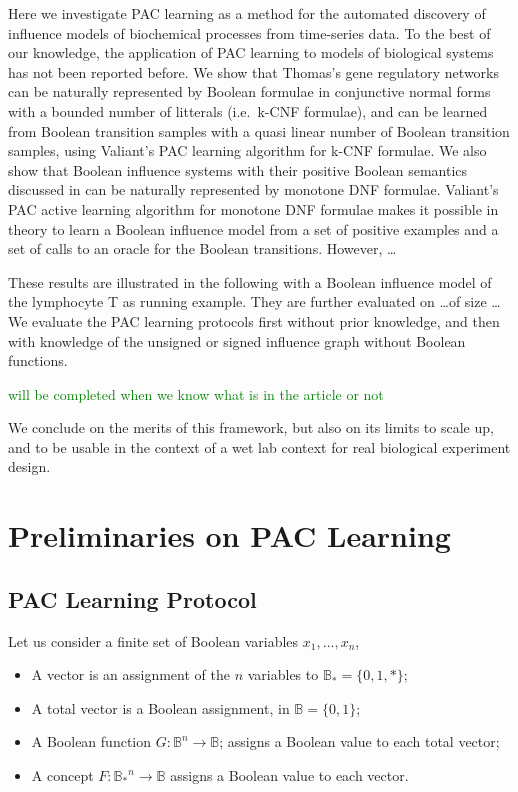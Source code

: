 \documentclass{llncs}
\newcommand{\sylvain}[1]{\textcolor{green}{#1}}
\begin{document}
Here we investigate PAC learning as a method for the automated discovery of influence models of biochemical processes from time-series data. 
To the best of our knowledge, 
the application of PAC learning to models of biological systems has not been reported before.
We show that Thomas's gene regulatory networks \cite{Thomas91jtb,Thomas73jtb} can be naturally represented by 
Boolean formulae in conjunctive normal forms with a bounded number of litterals (i.e.~k-CNF formulae),
and can be learned from Boolean transition samples with a quasi linear number of Boolean transition samples, using Valiant's PAC learning algorithm for k-CNF formulae.
We also show that Boolean influence systems with their positive Boolean semantics discussed in \cite{FMRS16cmsb}
can be naturally represented by monotone DNF formulae.
Valiant's PAC active learning algorithm for monotone DNF formulae makes it possible in theory 
to learn a Boolean influence model from a set of positive examples and a set of calls to an oracle for the Boolean transitions.
However, \dots

These results are illustrated in the following with a Boolean influence model of the lymphocyte T as running example.
They are further evaluated on \dots of size \dots
We evaluate the PAC learning protocols first without prior knowledge, and then with knowledge of the unsigned or signed influence graph without Boolean functions.

\sylvain{will be completed when we know what is in the article or not}

We conclude on the merits of this framework, but also on its limits to scale up,
and to be usable in the context of a wet lab context for real biological experiment design.


\section{Preliminaries on PAC Learning}\label{pac}

\subsection{PAC Learning Protocol}


Let us consider a finite set of Boolean variables $x_1,\ldots,x_n$,
\begin{itemize}
	\item A vector is an assignment of the $n$ variables to $\mathbb{B}_* = \{0,1,*\}$;
	\item A total vector is a Boolean assignment, in $\mathbb{B} = \{0,1\}$;
	\item A Boolean function $G:{\mathbb{B}}^n \rightarrow \mathbb{B}$;
	assigns a Boolean value to each total vector;
\item A concept $F:{\mathbb{B}_*}^n \rightarrow \mathbb{B}$
	assigns a Boolean value to each vector.
\end{itemize}
\end{document}
